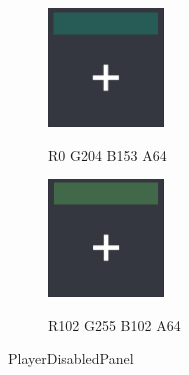 \begin{figure}[h]
\begin{subfigure}{0.22\textwidth}
\includegraphics[scale=1]{player5disabledpanel}
\label{fig:b}
\caption*{\hspace*{-0.35cm}R0 G204 B153 A64}
\end{subfigure}
\begin{subfigure}{0.22\textwidth}
\includegraphics[scale=1]{player6disabledpanel}
\label{fig:b}
\caption*{\hspace*{-0.35cm}R102 G255 B102 A64}
\end{subfigure}
\caption{PlayerDisabledPanel}
\end{figure}

